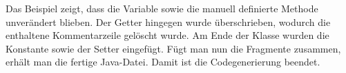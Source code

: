 
Das Beispiel zeigt, dass die Variable sowie die manuell definierte Methode unverändert blieben.
Der Getter hingegen wurde überschrieben, wodurch die enthaltene Kommentarzeile gelöscht wurde.
Am Ende der Klasse wurden die Konstante sowie der Setter eingefügt.
Fügt man nun die Fragmente zusammen, erhält man die fertige Java-Datei.
Damit ist die Codegenerierung beendet.
